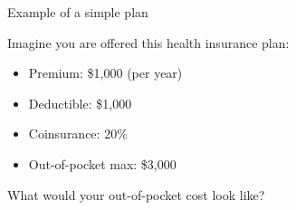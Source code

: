 \begin{frame}{Example of a simple plan}

    Imagine you are offered this health insurance plan:
    \begin{itemize}
        \item Premium: \$1,000 (per year)
        \item Deductible: \$1,000
        \item Coinsurance: 20\%
        \item Out-of-pocket max: \$3,000
    \end{itemize}
    \pause
    \vspace{5mm} What would your out-of-pocket cost look like?
    
\end{frame}
